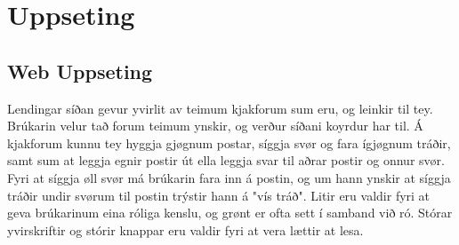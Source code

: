 \documentclass{article}
\begin{document}
\section{Uppseting}
 
\subsection{Web Uppseting}
\par Lendingar síðan gevur yvirlit av teimum kjakforum sum eru, og leinkir til tey. Brúkarin
velur tað forum teimum ynskir, og verður síðani koyrdur har til. Á kjakforum kunnu tey
hyggja gjøgnum postar, síggja svør og fara ígjøgnum tráðir, samt sum at leggja egnir postir
út ella leggja svar til aðrar postir og onnur svør. Fyri at síggja øll svør má brúkarin fara inn
á postin, og um hann ynskir at síggja tráðir undir svørum til postin trýstir hann á "vís tráð".
Litir eru valdir fyri at geva brúkarinum eina róliga kenslu, og grønt er ofta sett í samband
við ró. Stórar yvirskriftir og stórir knappar eru valdir fyri at vera lættir at lesa. 
\end{document}
